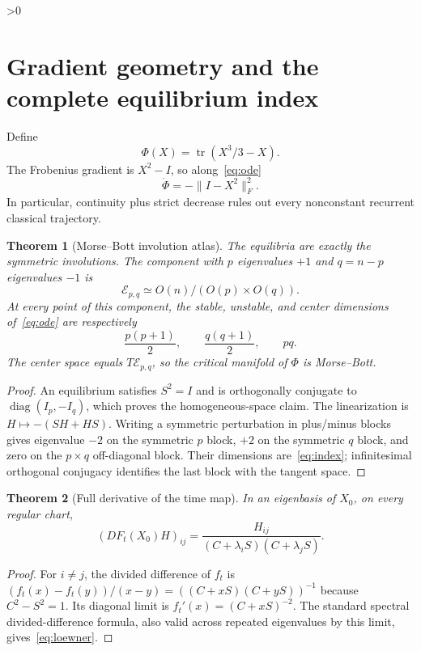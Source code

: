 \documentclass[10pt]{article}
\providecommand{\CRevisionRound}{2}
\newtheorem{theorem}{Theorem}
\newcommand{\tr}{\operatorname{tr}}
\begin{document}
\ifnum\CRevisionRound>0
\section{Gradient geometry and the complete equilibrium index}
Define
\begin{equation}\label{eq:phi}
 \Phi(X)=\tr(X^3/3-X).
\end{equation}
The Frobenius gradient is $X^2-I$, so along~\eqref{eq:ode}
\begin{equation}\label{eq:diss}
 \dot\Phi=-\|I-X^2\|_F^2.
\end{equation}
In particular, continuity plus strict decrease rules out every nonconstant
recurrent classical trajectory.

\begin{theorem}[Morse--Bott involution atlas]\label{thm:mb}
The equilibria are exactly the symmetric involutions.  The component with
$p$ eigenvalues $+1$ and $q=n-p$ eigenvalues $-1$ is
\[
 \mathcal E_{p,q}\simeq O(n)/(O(p)\times O(q)).
\]
At every point of this component, the stable, unstable, and center
dimensions of~\eqref{eq:ode} are respectively
\begin{equation}\label{eq:index}
 \frac{p(p+1)}2,\qquad \frac{q(q+1)}2,\qquad pq.
\end{equation}
The center space equals $T\mathcal E_{p,q}$, so the critical manifold of
$\Phi$ is Morse--Bott.
\end{theorem}
\begin{proof}
An equilibrium satisfies $S^2=I$ and is orthogonally conjugate to
$\operatorname{diag}(I_p,-I_q)$, which proves the homogeneous-space claim.
The linearization is $H\mapsto-(SH+HS)$.  Writing a symmetric perturbation
in plus/minus blocks gives eigenvalue $-2$ on the symmetric $p$ block,
$+2$ on the symmetric $q$ block, and zero on the $p\times q$ off-diagonal
block.  Their dimensions are~\eqref{eq:index}; infinitesimal orthogonal
conjugacy identifies the last block with the tangent space.
\end{proof}

\begin{theorem}[Full derivative of the time map]\label{thm:frechet}
In an eigenbasis of $X_0$, on every regular chart,
\begin{equation}\label{eq:loewner}
 (DF_t(X_0)H)_{ij}=
 \frac{H_{ij}}{(C+\lambda_iS)(C+\lambda_jS)}.
\end{equation}
\end{theorem}
\begin{proof}
For $i\ne j$, the divided difference of $f_t$ is
$(f_t(x)-f_t(y))/(x-y)=((C+xS)(C+yS))^{-1}$ because
$C^2-S^2=1$.  Its diagonal limit is $f_t'(x)=(C+xS)^{-2}$.
The standard spectral divided-difference formula, also valid across repeated
eigenvalues by this limit, gives~\eqref{eq:loewner}.
\end{proof}
\fi
\end{document}

